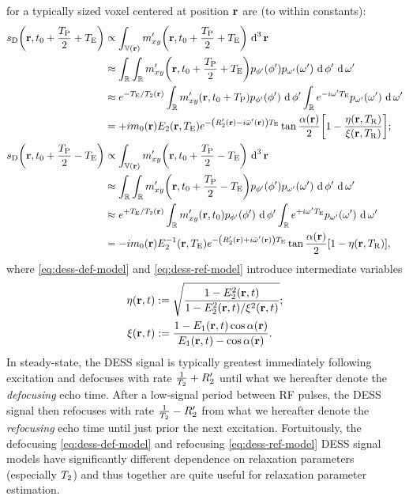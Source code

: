 for a typically sized voxel centered at position $\mathbf{r}$ are
(to within constants):
\begin{align}
	\dess\paren{\bmr,t_0+\frac{\TP}{2}+\TE} 
		&\propto \int_{\setV\paren{\bmr}} 
			\mxyp\paren{\bmr,t_0+\frac{\TP}{2}+\TE} \dercubed{\bmr}
			\label{eq:dess-def-int} \\
		&\approx \int_\real \int_\real \mxyp\paren{\bmr,t_0+\frac{\TP}{2}+\TE} 
			\dist{\php}\paren{\php} \dist{\omp}\paren{\omp} \der{\php} \der{\omp}
			\nonumber \\
		&\approx e^{-\TE/\Tt\pr}
			\int_\real \mxyp\paren{\bmr,t_0+\TP} \dist{\php}\paren{\php} \der{\php} 
			\int_\real e^{-i\omp\TE} \dist{\omp}\paren{\omp} \der{\omp}
			\nonumber \\
		&= +i\mzero\pr \Et\paren{\bmr,\TE} e^{-\paren{\Rtp\pr-i\ompmed\pr}\TE}
			\tan\frac{\alpha\pr}{2} 
			\brac{1 - \frac{\eta\paren{\bmr,\TR}}{\xi\paren{\bmr,\TR}}};
			\label{eq:dess-def-model} \\
	\dess\paren{\bmr,t_0+\frac{\TP}{2}-\TE}
		&\propto \int_{\setV\paren{\bmr}}
			\mxyp\paren{\bmr,t_0+\frac{\TP}{2}-\TE} \dercubed{\bmr}
			\label{eq:dess-ref-int} \\
		&\approx \int_\real \int_\real \mxyp\paren{\bmr,t_0+\frac{\TP}{2}-\TE} 
			\dist{\php}\paren{\php} \dist{\omp}\paren{\omp} \der{\php} \der{\omp}
			\nonumber \\
		&\approx e^{+\TE/\Tt\pr}
			\int_\real \mxyp\paren{\bmr,t_0} \dist{\php}\paren{\php} \der{\php} 
			\int_\real e^{+i\omp\TE} \dist{\omp}\paren{\omp} \der{\omp} 
			\nonumber \\
		&= -i\mzero\pr \Et^{-1}\paren{\bmr,\TE} e^{-\paren{\Rtp\pr+i\ompmed\pr}\TE}
			\tan\frac{\alpha\pr}{2}
			\brac{1 - \eta\paren{\bmr,\TR}},
			\label{eq:dess-ref-model}
\end{align}	
where \eqref{eq:dess-def-model} and \eqref{eq:dess-ref-model}
introduce intermediate variables
\begin{align}
	\eta\prt &:=
		\sqrt{\frac{1-\Et^2\prt}{1-\Et^2\prt/\xi^2\prt}};
		\nonumber \\
	\xi\prt &:=
		\frac{1-\Eo\prt \cos{\flip\pr}}{\Eo\prt - \cos{\flip\pr}}.
		\nonumber
\end{align}
In steady-state, 
the DESS signal is typically greatest 
immediately following excitation 
and defocuses with rate $\frac{1}{T_2}+R_2'$
until what we hereafter denote
the \emph{defocusing} echo time.
After a low-signal period between RF pulses,
the DESS signal then refocuses
with rate $\frac{1}{T_2}-R_2'$
from what we hereafter denote
the \emph{refocusing} echo time
until just prior the next excitation.
Fortuitously,
the defocusing \eqref{eq:dess-def-model}
and refocusing \eqref{eq:dess-ref-model}
DESS signal models
have significantly different dependence 
on relaxation parameters (especially $T_2$)
and thus together are quite useful
for relaxation parameter estimation.

